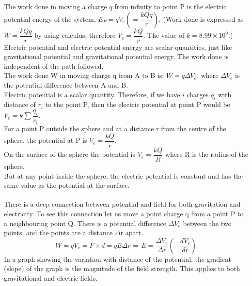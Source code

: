 The work done in moving a charge $q$ from infinity to point P is the electric potential energy of the system, $E_P=qV_e\left(=\dfrac{kQq}{r}\right)$. (Work done is expressed as $W=\dfrac{kQq}{r}$ by using calculus, therefore $V_e=\dfrac{kQ}{r}$. The value of $k=8.99\times 10^9$.)\\
Electric potential and electric potential energy are scalar quantities, just like gravitational potential and gravitational potential energy. The work done is independent of the path followed.\\
The work done W in moving charge q from A to B is: $W=q\Delta V_e$, where $\Delta V_e$ is the potential difference between A and B.\\
Electric potential is a scalar quantity. Therefore, if we have $i$ charges $q_i$ with distance of $r_i$ to the point P, then the electric potential at point P would be $V_e=\displaystyle k\sum \dfrac{q_i}{r_i}$.\\
For a point P outside the sphere and at a distance r from the centre of the sphere, the potential at P is $V_e=\dfrac{kQ}{r}$.\\
On the surface of the sphere the potential is $V_e=\dfrac{kQ}{R}$ where R is the radius of the sphere.\\
But at any point inside the sphere, the electric potential is constant and has the same value as the potential at the surface.\\\\
There is a deep connection between potential and field for both gravitation and electricity. To see this connection let us move a point charge q from a point P to a neighbouring point Q. There is a potential difference $\Delta V_e$ between the two points, and the points are a distance $\Delta$r apart.\\
$$W=qV_e=F\times d=qE\Delta r \Rightarrow E=\dfrac{\Delta V_e}{\Delta r}\left(-\dfrac{dV_e}{dr}\right)$$
In a graph showing the variation with distance of the potential, the gradient (slope) of the graph is the magnitude of the field strength. This applies to both gravitational and electric fields.
